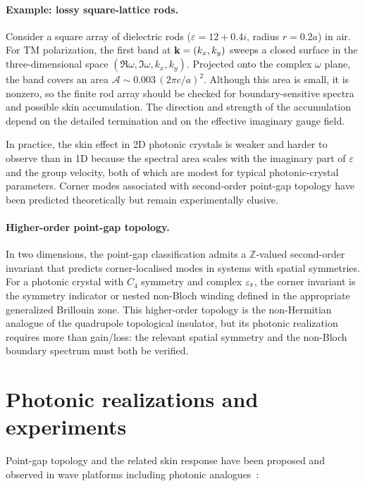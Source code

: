 \paragraph{Example: lossy square-lattice rods.}
Consider a square array of dielectric rods ($\varepsilon = 12 + 0.4i$,
radius $r = 0.2a$) in air. For TM polarization, the first band at
$\mathbf{k} = (k_x, k_y)$ sweeps a closed surface in the three-dimensional
space $(\Re\omega, \Im\omega, k_x, k_y)$. Projected onto the complex
$\omega$ plane, the band covers an area
$\mathcal{A} \sim 0.003\,(2\pi c/a)^2$. Although this area is small,
it is nonzero, so the finite rod array should be checked for
boundary-sensitive spectra and possible skin accumulation. The direction
and strength of the accumulation depend on the detailed termination and
on the effective imaginary gauge field.

In practice, the skin effect in 2D photonic crystals is weaker and
harder to observe than in 1D because the spectral area scales with the
imaginary part of $\varepsilon$ and the group velocity, both of which
are modest for typical photonic-crystal parameters. Corner modes
associated with second-order point-gap topology have been predicted
theoretically but remain experimentally elusive.

\paragraph{Higher-order point-gap topology.}
In two dimensions, the point-gap classification admits a
$\mathbb{Z}$-valued second-order invariant that predicts corner-localised
modes in systems with spatial symmetries. For a photonic crystal with
$C_4$ symmetry and complex $\varepsilon_{\mathrm{r}}$, the corner invariant is the
symmetry indicator or nested non-Bloch winding defined in the appropriate
generalized Brillouin zone. This higher-order topology is the
non-Hermitian analogue of the quadrupole topological insulator, but its
photonic realization requires more than gain/loss: the relevant spatial
symmetry and the non-Bloch boundary spectrum must both be verified.


\section{Photonic realizations and experiments}
\label{sec:point-gap-photonic}

Point-gap topology and the related skin response have been proposed and
observed in wave platforms including photonic analogues~\cite{he2016acoustic,yuan2025breakdown}:

